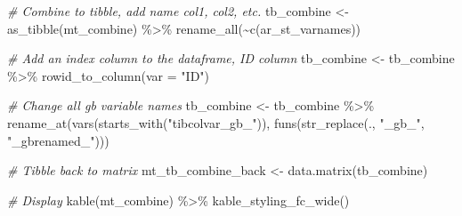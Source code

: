 \documentclass[
]{book}
\newenvironment{Shaded}{\begin{snugshade}}{\end{snugshade}}
\newcommand{\AttributeTok}[1]{\textcolor[rgb]{0.77,0.63,0.00}{#1}}
\newcommand{\CommentTok}[1]{\textcolor[rgb]{0.56,0.35,0.01}{\textit{#1}}}
\newcommand{\FunctionTok}[1]{\textcolor[rgb]{0.00,0.00,0.00}{#1}}
\newcommand{\NormalTok}[1]{#1}
\newcommand{\OtherTok}[1]{\textcolor[rgb]{0.56,0.35,0.01}{#1}}
\newcommand{\SpecialCharTok}[1]{\textcolor[rgb]{0.00,0.00,0.00}{#1}}
\newcommand{\StringTok}[1]{\textcolor[rgb]{0.31,0.60,0.02}{#1}}
\begin{document}
\begin{Shaded}
\begin{Highlighting}[]
\CommentTok{\# Combine to tibble, add name col1, col2, etc.}
\NormalTok{tb\_combine }\OtherTok{\textless{}{-}} \FunctionTok{as\_tibble}\NormalTok{(mt\_combine) }\SpecialCharTok{\%\textgreater{}\%} \FunctionTok{rename\_all}\NormalTok{(}\SpecialCharTok{\textasciitilde{}}\FunctionTok{c}\NormalTok{(ar\_st\_varnames))}

\CommentTok{\# Add an index column to the dataframe, ID column}
\NormalTok{tb\_combine }\OtherTok{\textless{}{-}}\NormalTok{ tb\_combine }\SpecialCharTok{\%\textgreater{}\%} \FunctionTok{rowid\_to\_column}\NormalTok{(}\AttributeTok{var =} \StringTok{"ID"}\NormalTok{)}

\CommentTok{\# Change all gb variable names}
\NormalTok{tb\_combine }\OtherTok{\textless{}{-}}\NormalTok{ tb\_combine }\SpecialCharTok{\%\textgreater{}\%}
                  \FunctionTok{rename\_at}\NormalTok{(}\FunctionTok{vars}\NormalTok{(}\FunctionTok{starts\_with}\NormalTok{(}\StringTok{"tibcolvar\_gb\_"}\NormalTok{)),}
                            \FunctionTok{funs}\NormalTok{(}\FunctionTok{str\_replace}\NormalTok{(., }\StringTok{"\_gb\_"}\NormalTok{, }\StringTok{"\_gbrenamed\_"}\NormalTok{)))}

\CommentTok{\# Tibble back to matrix}
\NormalTok{mt\_tb\_combine\_back }\OtherTok{\textless{}{-}} \FunctionTok{data.matrix}\NormalTok{(tb\_combine)}

\CommentTok{\# Display}
\FunctionTok{kable}\NormalTok{(mt\_combine) }\SpecialCharTok{\%\textgreater{}\%} \FunctionTok{kable\_styling\_fc\_wide}\NormalTok{()}
\end{Highlighting}
\end{Shaded}

\begin{table}[!h]
\centering
{}
\end{table}
\end{document}

